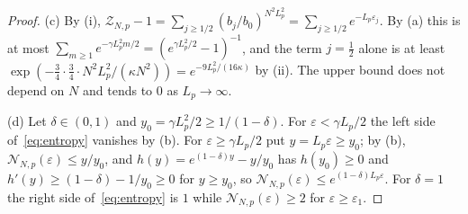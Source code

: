 \begin{proof}
(c) By (i), $\mathcal Z_{N,p}-1=\sum_{j\ge1/2}(b_j/b_0)^{N^2L_p^2}=\sum_{j\ge
1/2}e^{-L_p\varepsilon_j}$. By (a) this is at most $\sum_{m\ge1}e^{-\gamma
L_p^2m/2}=(e^{\gamma L_p^2/2}-1)^{-1}$, and the term $j=\frac12$ alone is at
least $\exp(-\frac34\cdot\frac34\cdot N^2L_p^2/(\kappa N^2))=e^{-9L_p^2/(16
\kappa)}$ by (ii). The upper bound does not depend on $N$ and tends to $0$ as
$L_p\to\infty$.

(d) Let $\delta\in(0,1)$ and $y_0=\gamma L_p^2/2\ge1/(1-\delta)$. For
$\varepsilon<\gamma L_p/2$ the left side of~\eqref{eq:entropy} vanishes by
(b). For $\varepsilon\ge\gamma L_p/2$ put $y=L_p\varepsilon\ge y_0$; by (b),
$\mathcal N_{N,p}(\varepsilon)\le y/y_0$, and $h(y)=e^{(1-\delta)y}-y/y_0$ has
$h(y_0)\ge0$ and $h'(y)\ge(1-\delta)-1/y_0\ge0$ for $y\ge y_0$, so
$\mathcal N_{N,p}(\varepsilon)\le e^{(1-\delta)L_p\varepsilon}$. For
$\delta=1$ the right side of~\eqref{eq:entropy} is $1$ while
$\mathcal N_{N,p}(\varepsilon)\ge2$ for $\varepsilon\ge\varepsilon_1$.
\end{proof}

